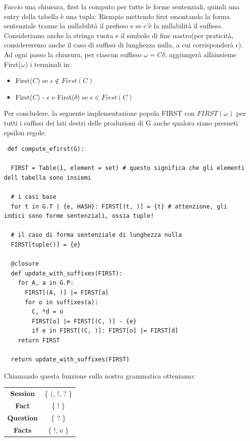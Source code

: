 Faccio una chiusura, first la computo per tutte le forme sentenziali, quindi una entry della tabella è una tupla:
Riempio mettendo first smontando la forma sentenziale tranne la nullabilità il prefisso e se c'è la nullabilità il suffisso. Consideriamo anche la stringa vuota e il simbolo di fine nastro(per praticità, considereremo anche il caso di suffissi di lunghezza nulla, a cui corrisponderà $\epsilon$). Ad ogni passo la chiusura, per ciascun suffisso $\omega = C\delta$, aggiungerà allàinsieme First($\omega$) i terminali in:
\begin{itemize}
  \item First($C$) se $\epsilon \not\in First(C)$
  \item First($C$) - $\epsilon$ e First($\delta$) se $\epsilon \in First(C)$
\end{itemize}
Per concludere, la seguente implementazione popola FIRST con $FIRST(\omega)$ per tutti i suffissi dei lati destri delle produzioni di G anche qualora siano presneti epsilon regole:
\begin{lstlisting}
 def compute_efirst(G):

  FIRST = Table(1, element = set) # questo significa che gli elementi dell tabella sono insiemi

  # i casi base
  for t in G.T | {e, HASH}: FIRST[(t, )] = {t} # attenzione, gli indici sono forme sentenziali, ossia tuple!

  # il caso di forma sentenziale di lunghezza nulla
  FIRST[tuple()] = {e}

  @closure
  def update_with_suffixes(FIRST):
    for A, a in G.P:
      FIRST[(A, )] |= FIRST[a]
      for o in suffixes(a):
        C, *d = o
        FIRST[o] |= FIRST[(C, )] - {e}
        if e in FIRST[(C, )]: FIRST[o] |= FIRST[d]
    return FIRST

  return update_with_suffixes(FIRST) 
\end{lstlisting}

Chiamando questa funzione sulla nostra grammatica otteniamo:
\begin{table}
  \centering
  \begin{tabular}{c|c}
    \textbf{Session} & \{ $($, !, ? \} \\
    \textbf{Fact} & \{ ! \} \\
    \textbf{Question} & \{ ? \} \\
    \textbf{Facts} & \{ !, e \} \\
    
  \end{tabular}
\end{table}

